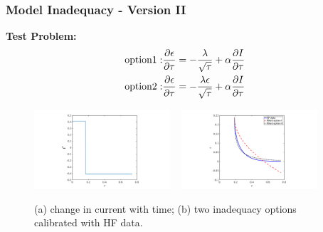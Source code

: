 \documentclass[10pt,xcolor=dvipsnames,compress]{beamer}
\begin{document}
\begin{frame}
\frametitle{Model Inadequacy - Version II}
\vfill

\textbf{Test Problem:}
\vspace{-0.2in}
\begin{eqnarray*}
{\rm option 1:} & \frac{\partial\epsilon}{\partial\tau} = -\frac{\lambda}{\sqrt{\tau}} + \alpha \frac{\partial I}{\partial\tau}\\
{\rm option 2:} & \frac{\partial\epsilon}{\partial\tau} = -\frac{\lambda\epsilon}{\sqrt{\tau}} + \alpha \frac{\partial I}{\partial\tau}
\end{eqnarray*}

\pause
\begin{figure}[h]
    \centering
    \includegraphics[trim = 3.8in 0.2in 4.3in 0.2in, clip, width=0.45\textwidth]{figs/I_1cycl.png} 
    ~
    \includegraphics[trim = 3.8in 0.2in 4.3in 0.2in, clip, width=0.45\textwidth]{figs/error_1cycl.png}
        \vspace{-3mm}
\caption{(a) change in current with time; (b) two inadequacy options calibrated with HF data.} 
\end{figure}


\vfill
\end{frame}
\end{document}
